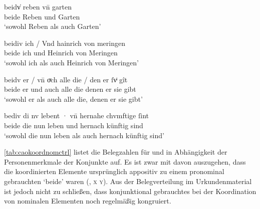 \begin{exe}
\ex \label{ex:caokonj2ctrl}
	\begin{xlist}
	\ex \label{ex:caokonj2ctrl_1}
		\gll beidv̍ reben vn̄ garten \\
			beide Reben und Garten \\
		\trans `sowohl Reben als auch Garten'
			\parencites(Nr.~2353, Basel, 1296)[462,28--29]{cao3}

	\ex \label{ex:caokonj2ctrl_2}
		\gll beidiv ich / Vnd hainrich von meringen \\
			beide ich {} und Heinrich von Meringen \\
		\trans `sowohl ich als auch Heinrich von Meringen'
			\parencites(Nr.~1347, Kl.~Steingaden, Kr.~Weilheim-Schongau, 1291)[578,25]{cao1}

	\ex \label{ex:caokonj2ctrl_3}
		\gll beidv er / vn̄ oͮch alle die / den er ſvͥ gît \\
			beide er {} und auch alle die {} denen er sie gibt \\
		\trans `sowohl er als auch alle die, denen er sie gibt'
			\parencites(Nr.~1566, Hüfingen, Schwarzwald-Baar-Kr., 1292)[717,18]{cao2}

	\ex \label{ex:caokonj2ctrl_4}
		\gll bediv di nv lebent · vn̄ hernahe chvmftige ſint \\
			beide die nun leben {} und hernach künftig sind \\
		\trans `sowohl die nun leben als auch hernach künftig sind'
			\parencites(Nr.~1352, Wien, 1291)[580,8]{cao2}
	\end{xlist}
\end{exe}

\cref{tab:caokoordnomctrl} listet die Belegzahlen für  und
 in Abhängigkeit der Personenmerkmale der Konjunkte auf. Es ist
zwar mit \citet[626]{ksw2} davon auszugehen, dass die koordinierten Elemente
ursprünglich appositiv zu einem pronominal gebrauchten `beide' waren
(, \textsc{x}  \textsc{y}). Aus der Belegverteilung im
Urkundenmaterial ist jedoch nicht  zu schließen, dass konjunktional
gebrauchtes  bei der Koordination von nominalen Elementen noch
regelmäßig kongruiert.

